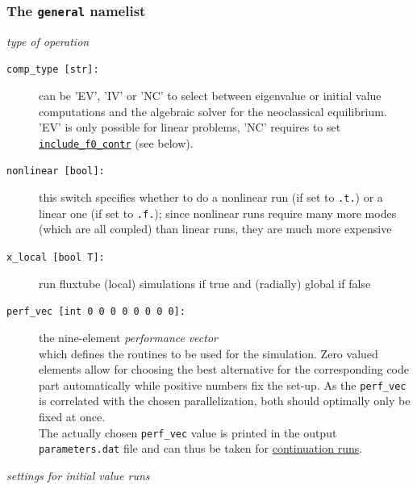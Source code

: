 \documentclass[12pt]{article}
\begin{document}
\subsubsection{The \texttt{general} namelist}
%
{\em type of operation}
\begin{description}
\item[\hypertarget{comp_type}{\texttt{comp\_type [str]:}}] can be 'EV', 'IV' or 'NC' to select between eigenvalue or initial value
computations and the algebraic solver for the neoclassical equilibrium. 'EV' is only possible for linear problems, 'NC' requires to set
\hyperlink{include_f0_contr}{\tt include\_f0\_contr} (see below).
\item[\texttt{nonlinear [bool]:}] this switch specifies whether to do a nonlinear run (if set to
\texttt{.t.}) or a linear one (if set to \texttt{.f.}); since nonlinear runs require many more
modes (which are all coupled) than linear runs, they are much more expensive
\item[\hypertarget{x_local}{\texttt{x\_local [bool T]:}}] run fluxtube (local) simulations if true and (radially) global if false
\item[\hypertarget{perf_vec}{\tt perf\_vec [int 0 0 0 0 0 0 0 0]:}] the nine-element
{\em performance} {\em vector}\\ which defines the routines to be used for the simulation.
Zero valued elements allow for choosing the best alternative for the corresponding code part
automatically while positive numbers fix the set-up. As the {\tt perf\_vec} is correlated
with the chosen parallelization, both should optimally only be fixed at once.\\
The actually chosen {\tt perf\_vec} value is printed in the output {\tt para\-me\-ters.dat} file and
can thus be taken for \hyperref[subsubsec:continue_sim]{continuation runs}.
\end{description}
%
{\em settings for initial value runs}
\end{document}

